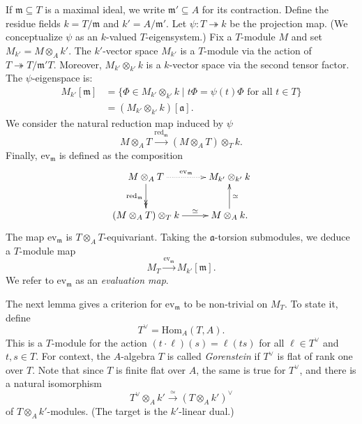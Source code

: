 \documentclass[10pt, twoside]{amsart}
\theoremstyle{plain}
\theoremstyle{definition}
\theoremstyle{remark}
\numberwithin{equation}{subsection}
\def\Hom{\mathrm{Hom}}
\def\gm{\mathfrak m}
\def\ga{\mathfrak a}
\def\ev{\mathrm{ev}}
\def\red{\mathrm{red}}
\begin{document}
If $\gm \subseteq T$ is a maximal ideal, we write $\gm' \subseteq A$ for its contraction. Define the residue fields ${ k} = T/\gm$ and $k' = A/\gm'$. Let $\psi: T \twoheadrightarrow { k}$ be the projection map. (We conceptualize $\psi$ as an ${ k}$-valued $T$-eigensystem.) Fix a $T$-module $M$ and set $M_{ k'} = M\otimes_A k'$. The $k'$-vector space $M_{ k'}$ is a $T$-module via the action of $T \twoheadrightarrow T/\gm' T$. Moreover, $M_{ k'}\otimes_{ k'} { k}$ is a ${ k}$-vector space via the second tensor factor. The $\psi$-eigenspace is:
\begin{align*}
 M_{ k'}[\gm] &= \{\Phi \in  M_{ k'}\otimes_{ k'} { k} \mid t\Phi = \psi(t)\Phi \text{ for all $t \in T$}\}\\
 &= (M_{ k'} \otimes_{ k'} { k})[\ga].
\end{align*}
We consider the natural reduction map induced by $\psi$
$$
M\otimes_A T \xrightarrow{\red_{\gm}} (M\otimes_A T) \otimes_T { k}.
$$
Finally, $\ev_{\gm}$ is defined as the composition
\begin{equation*}
\xymatrix{
M\otimes_A T \ar@{.>}[r]^-{\ev_{\gm}} \ar@{>>}[d]_-{\mathrm{red}_{\gm}} & M_{ k'}\otimes_{ k'} { k}\\
(M\otimes_A T) \otimes_T { k} \ar[r]^-{\simeq} & M\otimes_A { k} \ar[u]_-{\simeq}.
}
\end{equation*}
The map $\ev_{\gm}$ is $T\otimes_A T$-equivariant. Taking the $\ga$-torsion submodules, we deduce a $T$-module map
\begin{equation*}
 M_T \xrightarrow{\ev_{\gm}} M_{ k'}[\gm].
\end{equation*}
We refer to $\ev_{\gm}$ as an {\em evaluation map}. 

The next lemma gives a criterion for $\ev_{\gm}$ to be non-trivial on $M_T$. To state it, define \[T^\vee = \Hom_A(T,A).\] This is a $T$-module for the action $(t \cdot \ell)(s) = \ell(ts)$ for all $ \ell \in T^\vee$ and $t,s \in T$. For context, the $A$-algebra { $T$} is called \emph{Gorenstein} if $T^\vee$ is flat of rank one over $T$. Note that since $T$ is finite flat over $A$, the same is true for $T^\vee$, and there is a natural isomorphism
\begin{equation}\label{eqn:Tdual-iso}
T^\vee \otimes_A { k'} \xrightarrow{\simeq} (T\otimes_A { k'})^\vee
\end{equation}
of $T\otimes_A { k'}$-modules. (The target is the ${ k'}$-linear dual.)
\end{document}
